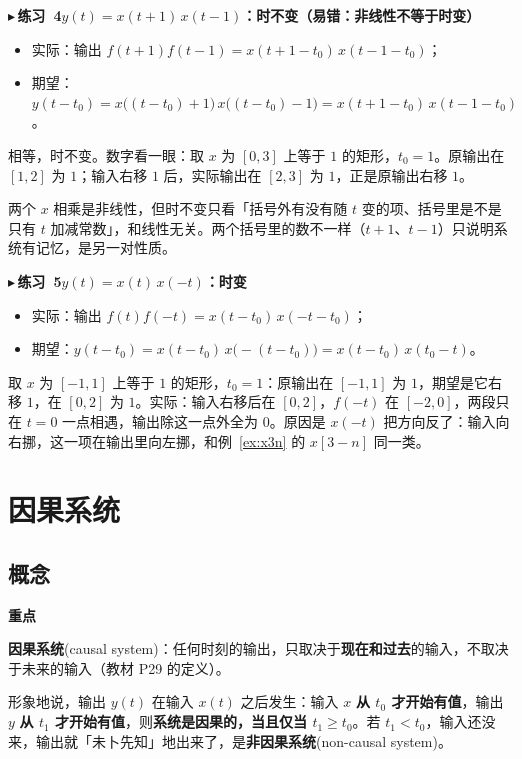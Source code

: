 \documentclass[UTF8,a4paper,11pt]{ctexart}
\newenvironment{remember}{\begin{rememberbox}\textbf{重点}\par\smallskip}{\end{rememberbox}}
\newcounter{ex}[section]
\newcommand{\point}[1]{\par\addvspace{1ex}\noindent\textcolor{ptteal}{$\blacktriangleright$\,\textbf{#1}}\ }
\begin{document}
\point{练习~4\quad$y(t)=x(t+1)\,x(t-1)$：时不变（易错：非线性不等于时变）}
\begin{itemize}[nosep]
\item 实际：输出 $f(t+1)f(t-1)=x(t+1-t_0)\,x(t-1-t_0)$；
\item 期望：$y(t-t_0)=x\bigl((t-t_0)+1\bigr)\,x\bigl((t-t_0)-1\bigr)=x(t+1-t_0)\,x(t-1-t_0)$。
\end{itemize}
相等，时不变。数字看一眼：取 $x$ 为 $[0,3]$ 上等于 $1$ 的矩形，$t_0=1$。原输出在 $[1,2]$ 为 $1$；输入右移 $1$ 后，实际输出在 $[2,3]$ 为 $1$，正是原输出右移 $1$。

两个 $x$ 相乘是非线性，但时不变只看「括号外有没有随 $t$ 变的项、括号里是不是只有 $t$ 加减常数」，和线性无关。两个括号里的数不一样（$t+1$、$t-1$）只说明系统有记忆，是另一对性质。

\point{练习~5\quad$y(t)=x(t)\,x(-t)$：时变}
\begin{itemize}[nosep]
\item 实际：输出 $f(t)f(-t)=x(t-t_0)\,x(-t-t_0)$；
\item 期望：$y(t-t_0)=x(t-t_0)\,x\bigl(-(t-t_0)\bigr)=x(t-t_0)\,x(t_0-t)$。
\end{itemize}
取 $x$ 为 $[-1,1]$ 上等于 $1$ 的矩形，$t_0=1$：原输出在 $[-1,1]$ 为 $1$，期望是它右移 $1$，在 $[0,2]$ 为 $1$。实际：输入右移后在 $[0,2]$，$f(-t)$ 在 $[-2,0]$，两段只在 $t=0$ 一点相遇，输出除这一点外全为 $0$。原因是 $x(-t)$ 把方向反了：输入向右挪，这一项在输出里向左挪，和例~\ref{ex:x3n} 的 $x[3-n]$ 同一类。

\section{因果系统}
\subsection{概念}
\begin{remember}
\textbf{因果系统}(causal system)：任何时刻的输出，只取决于\textbf{现在和过去}的输入，不取决于未来的输入（教材 P29 的定义）。
\end{remember}
形象地说，输出 $y(t)$ 在输入 $x(t)$ 之后发生：输入 $x$ \textbf{从 $t_0$ 才开始有值}，输出 $y$ \textbf{从 $t_1$ 才开始有值}，则\textbf{系统是因果的，当且仅当 $t_1\ge t_0$}。若 $t_1<t_0$，输入还没来，输出就「未卜先知」地出来了，是\textbf{非因果系统}(non-causal system)。
\end{document}
